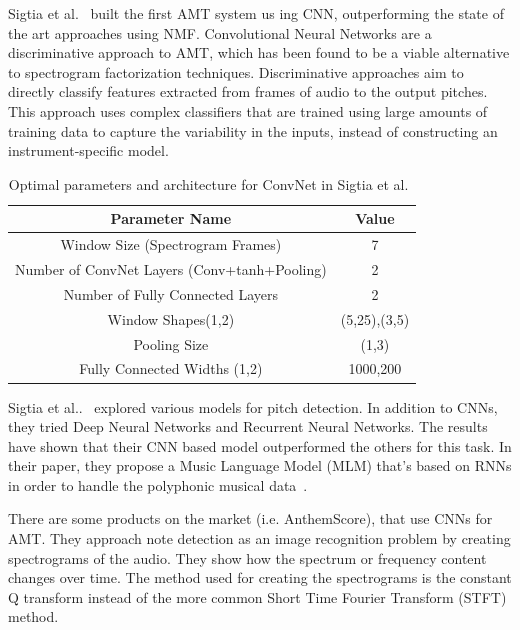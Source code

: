 Sigtia et al.~\cite{REF:10} built the first AMT system us	ing CNN, outperforming the state of the art approaches using NMF. Convolutional
Neural Networks are a discriminative approach to AMT, which has been found to be a
viable alternative to spectrogram factorization techniques. Discriminative approaches
aim to directly classify features extracted from frames of audio to the output pitches.
This approach uses complex classifiers that are trained using large amounts of training
data to capture the variability in the inputs, instead of constructing an instrument-specific model. 
\par

\begin{table} [h!]
	\centering
	\caption{Optimal parameters and architecture for ConvNet in Sigtia et al.~\cite{REF:7}}
	\begin{tabular}{ |c|c| } 
		\hline
		Parameter Name & Value \\ \hline
		Window Size (Spectrogram Frames) &  7 \\ \hline
		Number of ConvNet Layers (Conv+tanh+Pooling) & 2 \\ \hline
		Number of Fully Connected Layers & 2 \\ \hline
		Window Shapes(1,2) & (5,25),(3,5) \\ \hline
		Pooling Size & (1,3) \\ \hline
		Fully Connected Widths (1,2) & 1000,200 \\
		\hline
	\end{tabular}
	\label{table:sigtia}
\end{table}

Sigtia et al..~\cite{REF:10} explored various models for pitch detection. In addition to CNNs, they tried Deep Neural Networks and Recurrent Neural Networks. The results have shown that their CNN based model outperformed the others for this task. In their paper, they propose a Music Language Model (MLM) that's based on RNNs in order to handle the polyphonic musical data~\cite{benetos}.
\par

There are some products on the market (i.e. AnthemScore), that use CNNs for AMT. They approach note detection as an image recognition problem by creating spectrograms of the audio. They show how the spectrum or frequency content changes over time. The method used for creating the spectrograms is the constant Q transform instead of the more common Short Time Fourier Transform (STFT) method.
\par



